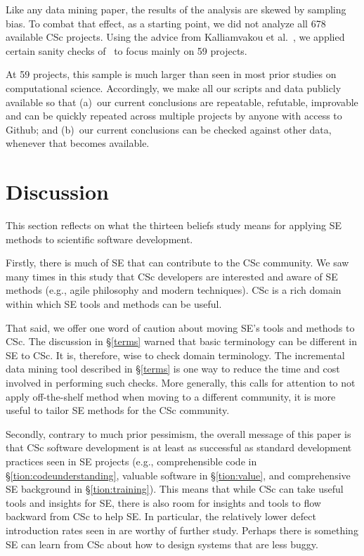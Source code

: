 \documentclass[conference,10pt]{IEEEtran}
\begin{document}
Like any data mining paper,
the results of the analysis are skewed by sampling bias.
To combat that effect, 
as a starting point, we did not analyze all 678 available CSc projects. 
Using the advice from Kalliamvakou et al.~\cite{Kalliamvakou:2014, tu2019better}, we applied certain sanity checks of~  to focus mainly on 59  projects.

At 59 projects, this sample is much larger than seen in
most prior studies on computational
science. 
Accordingly, we make all our scripts and data publicly available so that
(a)~our current conclusions
are repeatable, refutable, improvable and can be quickly repeated across multiple projects by anyone with access to Github; and (b)~our current conclusions can be checked against other data, whenever that becomes available.


\section{Discussion}
This section reflects on what the thirteen beliefs study means for applying SE methods to scientific software development.

Firstly, there is much of SE that can contribute to the CSc community. We saw many times in this study that CSc developers are interested and aware of SE methods (e.g., agile philosophy and modern techniques). CSc is a rich domain within which SE tools and methods can be useful.

That said,  we offer one word of caution about moving SE's tools and methods to CSc. The discussion in \S\ref{terms} warned that basic terminology can be different in SE to CSc. It is, therefore, wise to check domain terminology. The incremental data mining tool described in \S\ref{terms} is one way to reduce the time and cost
involved in performing such checks. More generally, this calls for attention to not apply off-the-shelf method when moving to a different community, it is more useful to tailor SE methods for the CSc community.

Secondly, contrary to much prior pessimism, the overall message of this paper is that CSc software development is at least as successful as standard development practices seen in SE projects (e.g., comprehensible code in \S\ref{tion:codeunderstanding}, valuable software in \S\ref{tion:value}, and comprehensive SE background in \S\ref{tion:training}). This means that while CSc can take useful tools and insights for SE, there is also room for insights and tools to flow backward from CSc to help SE.
In particular, the relatively lower defect introduction rates seen in  are worthy of further study. Perhaps there is something SE can learn from CSc about how to design systems that are less buggy.
\end{document}
